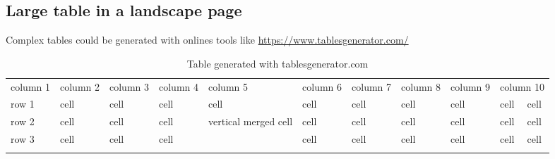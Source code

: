 \documentclass[Theme1]{{template_material/eurostat}}
\begin{document}
\begin{landscape}
\subsection{Large table in a landscape page}
Complex tables could be generated with onlines tools like \url{https://www.tablesgenerator.com/}

\begin{table}[htbp]
 \caption{Table generated with tablesgenerator.com}
 \label{table:C}
 
    \begin{tabular}{l|l|l|l|l|l|l|l|l|l|l}
    \hlinesep
     \rowcolor{TH20p} column 1 & column 2 & column 3 & column 4 & column 5                              & column 6 & column 7 & column 8 & column 9 & \multicolumn{2}{l}{column 10} \\ \hlinesep
   
    row 1    & cell     & cell     & cell     & cell                                  & cell     & cell     & cell     & cell     & cell           & cell          \\ \hline
    row 2    & cell     & cell     & cell     & \multirow{2}{*}{vertical merged cell} & cell     & cell     & cell     & cell     & cell           & cell          \\ \cline{1-4} \cline{6-11} 
    row 3    & cell     & cell     & cell     &                                       & cell     & cell     & cell     & cell     & cell           & cell          \\ \hlinesep
    \end{tabular}
\end{table}




\begin{table}[ht]


\end{table}
\end{landscape}
\end{document}
